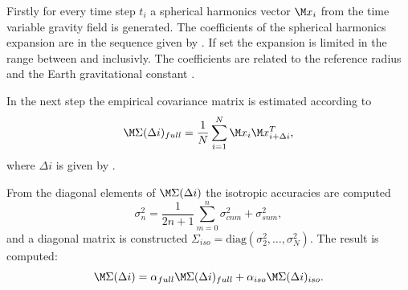 Firstly for every time step $t_i$
a spherical harmonics vector $\M x_i$ from the time variable gravity field
is generated. The coefficients of the spherical harmonics expansion are
in the sequence given by .
If set the expansion is limited in the range between 
and  inclusivly. The coefficients are related to the
reference radius~ and the Earth gravitational constant .

In the next step the empirical covariance matrix is estimated according to
\begin{equation}
\M\Sigma(\Delta i)_{full} = \frac{1}{N}\sum_{i=1}^N \M x_i \M x_{i+\Delta i}^T,
\end{equation}
where $\Delta i$ is given by .

From the diagonal elements of $\M\Sigma(\Delta i)$ the isotropic accuracies
are computed
\begin{equation}
\sigma_n^2 = \frac{1}{2n+1}\sum_{m=0}^n \sigma_{cnm}^2+\sigma_{snm}^2,
\end{equation}
and a diagonal matrix is constructed $\Sigma_{iso} = \text{diag}(\sigma_2^2,\ldots,\sigma_N^2)$.
The result is computed:
\begin{equation}
\M\Sigma(\Delta i) = \alpha_{full}\M\Sigma(\Delta i)_{full}+\alpha_{iso}\M\Sigma(\Delta i)_{iso}.
\end{equation}


